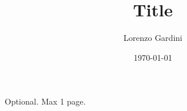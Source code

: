 \documentclass[12pt,a4paper,openright,twoside]{book}
\title{Title}
\author{Lorenzo Gardini}
\date{\today}
\begin{document}
\lstset{language=python}






% 
% 
% 
% 


% 
% 


\backmatter




\begin{acknowledgements}
Optional. Max 1 page.
\end{acknowledgements}
\end{document}
